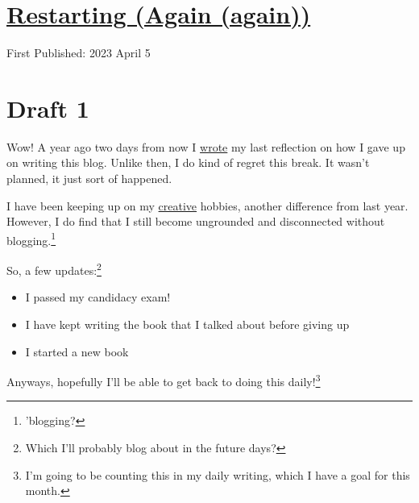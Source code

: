 \documentclass[12pt]{article}[titlepage]
\newcommand{\1}{\={a}}
\newcommand{\2}{\={e}}
\newcommand{\3}{\={\i}}
\newcommand{\4}{\=o}
\newcommand{\5}{\=u}
\newcommand{\6}{\={A}}
\renewcommand{\,}{\textsuperscript{,}}
\begin{document}
\doublespacing
\section{\href{restarting-again-again.html}{Restarting (Again (again))}}
First Published: 2023 April 5


\section{Draft 1}
Wow! A year ago two days from now I \href{restarting-again}{wrote} my last reflection on how I gave up on writing this blog.
Unlike then, I do kind of regret this break.
It wasn't planned, it just sort of happened.

I have been keeping up on my \href{creative-hobbies.html}{creative} hobbies, another difference from last year.
However, I do find that I still become ungrounded and disconnected without blogging.\footnote{'blogging?}

So, a few updates:\footnote{Which I'll probably blog about in the future days?}\\
\begin{itemize}
\item I passed my candidacy exam!
\item I have kept writing the book that I talked about before giving up
\item I started a new book
\end{itemize}

Anyways, hopefully I'll be able to get back to doing this daily!\footnote{I'm going to be counting this in my daily writing, which I have a goal for this month.}
\end{document}
